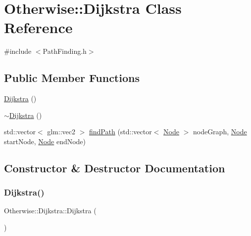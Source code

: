\hypertarget{class_otherwise_1_1_dijkstra}{}\section{Otherwise\+:\+:Dijkstra Class Reference}
\label{class_otherwise_1_1_dijkstra}


{\ttfamily \#include $<$Path\+Finding.\+h$>$}

\subsection*{Public Member Functions}
\begin{DoxyCompactItemize}
\item 
\hyperlink{class_otherwise_1_1_dijkstra_af69158eb202626aa185b6d6c50b8fcd4}{Dijkstra} ()
\item 
\hyperlink{class_otherwise_1_1_dijkstra_a2582b3abb802641e51f52397da807f31}{$\sim$\+Dijkstra} ()
\item 
std\+::vector$<$ glm\+::vec2 $>$ \hyperlink{class_otherwise_1_1_dijkstra_a8dc4ac530a7eb88cd7f5546c6a784ac3}{find\+Path} (std\+::vector$<$ \hyperlink{struct_otherwise_1_1_node}{Node} $>$ node\+Graph, \hyperlink{struct_otherwise_1_1_node}{Node} start\+Node, \hyperlink{struct_otherwise_1_1_node}{Node} end\+Node)
\end{DoxyCompactItemize}


\subsection{Constructor \& Destructor Documentation}
\mbox{\label{class_otherwise_1_1_dijkstra_af69158eb202626aa185b6d6c50b8fcd4}} 
\subsubsection{\texorpdfstring{Dijkstra()}{Dijkstra()}}
{\footnotesize\ttfamily Otherwise\+::\+Dijkstra\+::\+Dijkstra (\begin{DoxyParamCaption}{ }\end{DoxyParamCaption})}

\mbox{\label{class_otherwise_1_1_dijkstra_a2582b3abb802641e51f52397da807f31}} 
